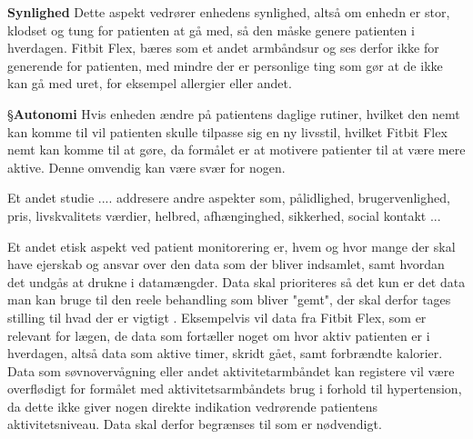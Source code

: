 \textbf{Synlighed}
Dette aspekt vedrører enhedens synlighed, altså om enhedn er stor, klodset og tung for patienten at gå med, så den måske genere patienten i hverdagen. Fitbit Flex, bæres som et andet armbåndsur og ses derfor ikke for generende for patienten, med mindre der er personlige ting som gør at de ikke kan gå med uret, for eksempel allergier eller andet.

§\textbf{Autonomi}
Hvis enheden ændre på patientens daglige rutiner, hvilket den nemt kan komme til vil patienten skulle tilpasse sig en ny livsstil, hvilket Fitbit Flex nemt kan komme til at gøre, da formålet er at motivere patienter til at være mere aktive. Denne omvendig kan være svær for nogen. 

Et andet studie .... addresere andre aspekter som, pålidlighed, brugervenlighed, pris, livskvalitets værdier, helbred, afhænginghed, sikkerhed, social kontakt ...
\citep{Nordgren2013}

Et andet etisk aspekt ved patient monitorering er, hvem og hvor mange der skal have ejerskab og ansvar over den data som der bliver indsamlet, samt hvordan det undgås at drukne i datamængder. Data skal prioriteres så det kun er det data man kan bruge til den reele behandling som bliver "gemt", der skal derfor tages stilling til hvad der er vigtigt \citep{patienthome2015}. Eksempelvis vil data fra Fitbit Flex, som er relevant for lægen, de data som fortæller noget om hvor aktiv patienten er i hverdagen, altså data som aktive timer, skridt gået, samt forbrændte kalorier. Data som søvnovervågning eller andet aktivitetarmbåndet kan registere vil være overflødigt for formålet med aktivitetsarmbåndets brug i forhold til hypertension, da dette ikke giver nogen direkte indikation vedrørende patientens aktivitetsniveau. Data skal derfor begrænses til som er nødvendigt. 









